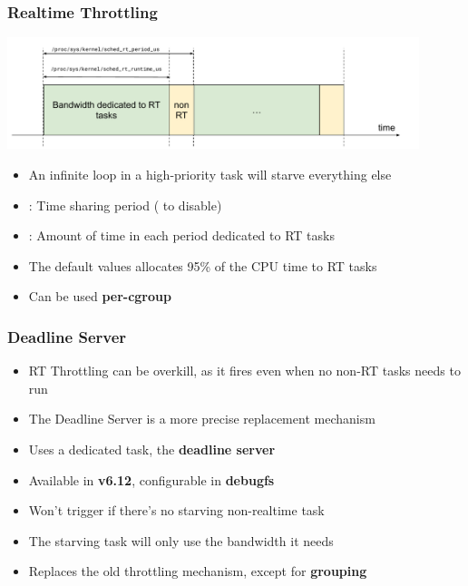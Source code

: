 \begin{frame}
	\frametitle{Realtime Throttling}
	\includegraphics[width=0.9\textwidth]{slides/realtime-linux-configuration/rt_throttling.pdf}
	\begin{itemize}
		\item An infinite loop in a high-priority task will starve everything else
		\item {} : Time sharing period ( to disable)
		\item {} : Amount of time in each period dedicated to RT tasks
		\item The default values allocates 95\% of the CPU time to RT tasks
		\item Can be used \textbf{per-cgroup}
	\end{itemize}
\end{frame}

\begin{frame}
	\frametitle{Deadline Server}
	\begin{itemize}
		\item RT Throttling can be overkill, as it fires even when no non-RT tasks needs to run
		\item The Deadline Server is a more precise replacement mechanism
		\item Uses a dedicated  task, the \textbf{deadline server}
		\item Available in \textbf{v6.12}, configurable in \textbf{debugfs}
		\item Won't trigger if there's no starving non-realtime task
		\item The starving task will only use the bandwidth it needs
		\item Replaces the old throttling mechanism, except for \textbf{grouping}
	\end{itemize}
\end{frame}

